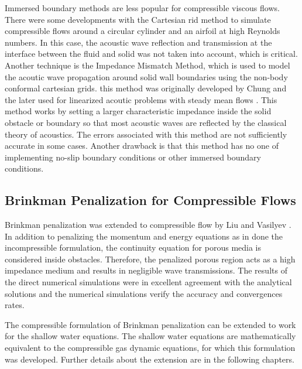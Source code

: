 Immersed boundary methods are less popular for compressible viscous flows.  There were some developments with the Cartesian rid method to simulate compressible flows around a circular cylinder and an airfoil at high Reynolds numbers.  In this case, the acoustic wave reflection and transmission at the interface between the fluid and solid was not taken into account, which is critical.  Another technique is the Impedance Mismatch Method, which is used to model the acoutic wave propagation around solid wall boundaries using the non-body conformal cartesian grids.   this method was originally developed by Chung \cite{95Chung} and the later used for linearized acoutic problems with steady mean flows \cite{98CM, 00LM, 00AM}.  This method works by setting a larger characteristic impedance inside the solid obstacle or boundary so that most acoustic waves are reflected by the classical theory of acoustics.  The errors associated with this method are not sufficiently accurate in some cases.  Another drawback is that this method has no one of implementing no-slip boundary conditions or other immersed boundary conditions.  

\subsection{Brinkman Penalization for Compressible Flows}

Brinkman penalization was extended to compressible flow by Liu and Vasilyev \cite{06LV}.  In addition to penalizing the momentum and energy equations as in done the incompressible formulation, the continuity equation for porous media is considered inside obstacles.  Therefore, the penalized porous region acts as a high impedance medium and results in negligible wave transmissions.  The results of the direct numerical simulations were in excellent agreement with the analytical solutions and the numerical simulations verify the accuracy and convergences rates.  

The compressible formulation of Brinkman penalization can be extended to work for the shallow water equations.  The shallow water equations are mathematically equivalent to the compressible gas dynamic equations, for which this formulation was developed.  Further details about the extension are in the following chapters.  

